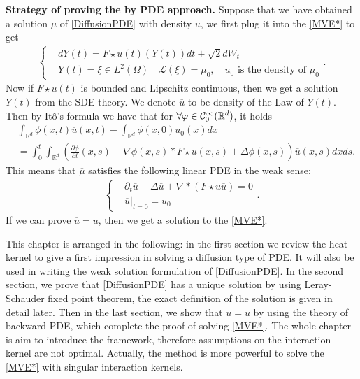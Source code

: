 {\bf Strategy of proving the  by PDE approach.}
Suppose that we have obtained a solution $\mu $ of \autoref{DiffusionPDE} with density $u$, we first plug it into the \autoref{MVE*} to get
 \begin{align*}
   \begin{cases}
    &dY(t) = F\star u(t)(Y(t)) dt + \sqrt{2} dW_t \\
    &Y(t) = \xi \in  L^2(\Omega ) \quad \mathcal{L}(\xi) = \mu_0,\quad u_0 \mbox{ is the density of }\mu_0
  \end{cases}
 .\end{align*}
 Now if $F\star u(t)$ is bounded and Lipschitz continuous, then we get a solution $Y(t)$ from the SDE theory. We denote $\overline{u} $ to be density of the Law of $Y(t)$.
 Then by It\^o's formula we have that for $\forall  \varphi \in \mathcal{C}_0^{\infty}(\mathbb{R}^d) $, it holds
\begin{align*}
  &\int_{\mathbb{R}^{d} } \phi (x,t) \overline{u}(x,t)  - \int_{\mathbb{R}^{d} } \phi(x,0) u_0(x) dx \\
  &=  \int_0^{t} \int_{\mathbb{R}^{d} } \left(\frac{\partial \phi }{\partial t}(x,s) + \nabla \phi(x,s)*F\star u(x,s) +  \Delta \phi(x,s)\right)\overline{u}(x,s) dx ds
.\end{align*}
This means that $\overline{\mu } $ satisfies the following linear PDE in the weak sense:
\begin{align}\label{DiffusionBar}
  \begin{cases}
    &\partial_t \overline{u}  - \Delta \overline{u }  + \nabla * (F\star u\overline{u } ) = 0\\
    &\overline{u } \rvert_{t=0}  = u_0
  \end{cases}
.\end{align}
If we can prove $\overline{u} = u $, then we get a solution to the \autoref{MVE*}. 

This chapter is arranged in the following: in the first section we review the heat kernel to give a first impression in solving a diffusion type of PDE. It will also be used in writing the weak solution formulation of \autoref{DiffusionPDE}. In the second section, we prove that  \autoref{DiffusionPDE} has a unique solution by using Leray-Schauder fixed point theorem, the exact definition of the solution is given in detail later. Then in the last section, we show that $u=\overline{u}$ by using the theory of backward PDE, which complete the proof of solving  \autoref{MVE*}. The whole chapter is aim to introduce the framework, therefore assumptions on the interaction kernel are not optimal. Actually, the method is more powerful to solve the \autoref{MVE*} with singular interaction kernels.


